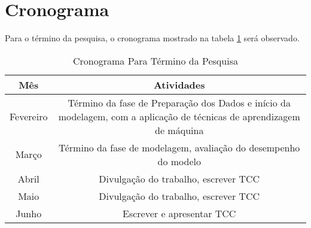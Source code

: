 \section{Cronograma}
Para o término da pesquisa, o cronograma mostrado na tabela \ref{cronograma} será
observado.
\begin{table}[htb]
\begin{center}
\begin{tabular}[c]{| c | c |}
    \hline
    \textbf{Mês} & \textbf{Atividades} \\
    \hline
    Fevereiro & Término da fase de Preparação dos Dados e início da modelagem, com a
    aplicação de técnicas de aprendizagem de máquina \\
    \hline
    \hline
    Março & Término da fase de modelagem, avaliação do desempenho do modelo\\
    \hline
    \hline
    Abril & Divulgação do trabalho, escrever TCC \\
    \hline
    \hline
    Maio & Divulgação do trabalho, escrever TCC \\
    \hline
    \hline
    Junho & Escrever e apresentar TCC \\
    \hline
\end{tabular}
\end{center}
\caption{Cronograma Para Término da Pesquisa}
\label{cronograma}
\end{table}

